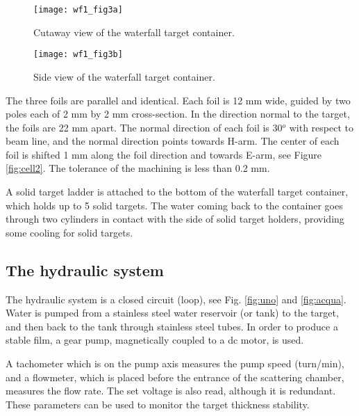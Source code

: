 \begin{figure}[htp]
\begin{center}
\texttt{[image: wf1\_fig3a]}
\caption[Waterfall Target: Target Container]{Cutaway view of the waterfall target container.}
\label{fig:cell3a}
\end{center}
\end{figure}

\begin{figure}[htp]
\begin{center}
\texttt{[image: wf1\_fig3b]}
\caption[Waterfall Target: Side View]{Side view of the waterfall target container.}
\label{fig:cell3b}
\end{center}
\end{figure}


The three foils are parallel and identical. Each foil is 12 mm wide, 
guided by two poles each of 2 mm by 2 mm cross-section. 
In the direction normal to the target, the foils are 22 mm 
apart. The normal direction of each foil is 30$^o$ with respect to beam line, 
and the normal direction points  towards H-arm. The center of each foil is 
shifted 1 mm along the foil direction and towards E-arm, see Figure 
\ref{fig:cell2}. The tolerance of the 
machining is less than 0.2 mm.  

A solid target ladder is attached to the bottom of the waterfall target 
container, which holds up to 5 solid targets. The 
water coming back to the container goes through two cylinders
in contact with the side of solid target holders, providing some cooling for
solid targets. 

\subsection{The hydraulic system}

The hydraulic system is a closed circuit (loop), see Fig. \ref{fig:uno} and 
\ref{fig:acqua}. Water is pumped from a stainless steel water
reservoir (or tank)
to the target, and then back to the tank through stainless steel tubes.
In order to produce a stable film, a gear  pump, magnetically coupled to a 
dc motor, is used.

A tachometer which is on the pump axis measures the pump speed (turn/min), 
and a flowmeter, which is placed before the entrance of the 
scattering chamber, measures the flow rate. The set
voltage is also read, although it is redundant.
These parameters can be used to
monitor the target thickness stability.

